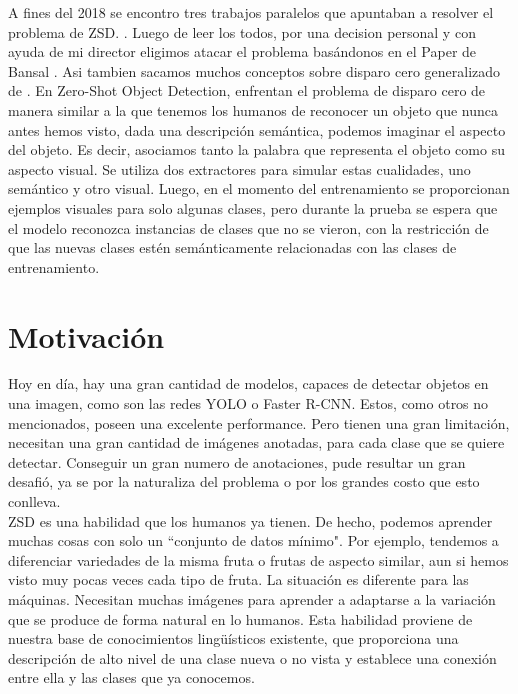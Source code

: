A fines del 2018 se encontro tres trabajos paralelos que apuntaban a resolver el problema de ZSD. \cite{rahman2018zero} \cite{zhu2018zero} \cite{bansal2018zero}. Luego de leer los todos, por una decision personal y con ayuda de mi director eligimos atacar el problema basándonos en el Paper de Bansal \cite{bansal2018zero}. Asi tambien sacamos muchos conceptos sobre disparo cero generalizado de \cite{zero-shot-generalizado}. En Zero-Shot Object Detection\cite{bansal2018zero}, enfrentan el problema de disparo cero de manera similar a la que tenemos los humanos de reconocer un objeto que nunca antes hemos visto, dada una descripción semántica, podemos imaginar el aspecto del objeto.  Es decir, asociamos tanto la palabra que representa el objeto como su aspecto visual. Se utiliza dos extractores para simular estas cualidades, uno semántico y otro visual. Luego, en el momento del entrenamiento se proporcionan ejemplos visuales para solo algunas clases, pero durante la prueba se espera que el modelo reconozca instancias de clases que no se vieron, con la restricción de que las nuevas clases estén semánticamente relacionadas con las clases de entrenamiento.\\



\section{Motivación}

Hoy en día, hay una gran cantidad de modelos, capaces de detectar objetos en una imagen, como son las redes YOLO o Faster R-CNN. Estos, como otros no mencionados, poseen una excelente performance. Pero tienen una gran limitación, necesitan una gran cantidad de imágenes anotadas, para cada clase que se quiere detectar. Conseguir un gran numero de anotaciones, pude resultar un gran desafió, ya se por la naturaliza del problema o por los grandes costo que esto conlleva.\\ 

ZSD es una habilidad que los humanos ya tienen. De hecho, podemos aprender muchas cosas con solo un ``conjunto de datos mínimo". Por ejemplo, tendemos a diferenciar  variedades de la misma fruta o frutas de aspecto similar, aun si hemos visto muy pocas veces cada tipo de fruta. La situación es diferente para las máquinas. Necesitan muchas imágenes para aprender a adaptarse a la variación que se produce de forma natural en lo humanos. Esta habilidad proviene de nuestra base de conocimientos lingüísticos existente, que proporciona una descripción de alto nivel de una clase nueva o no vista y establece una conexión entre ella y las clases que ya conocemos.\\

